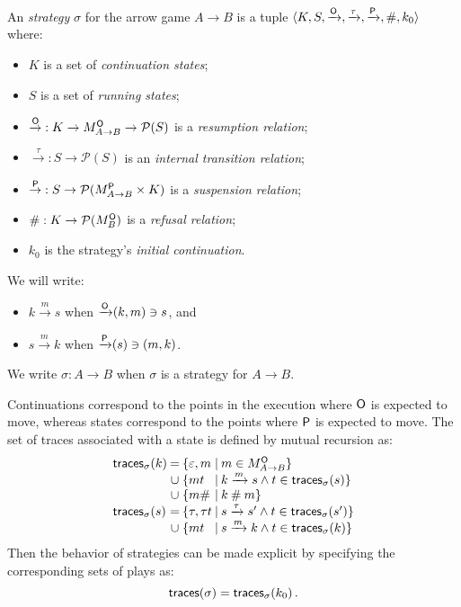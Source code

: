 \begin{definition} %
An \emph{strategy} $\sigma$ for the arrow game $A \rightarrow B$
is a tuple
$\langle K, S,
{\xrightarrow{ \mathsf{O} } },
{\xrightarrow{\tau}},
{\xrightarrow{ \mathsf{P} } },
 \#, k_0 \rangle$
where:
\begin{itemize}
  \item $K$ is a set of \emph{continuation states};
  \item $S$ is a set of \emph{running states};
  \item ${\stackrel{ \mathsf{O} }{\rightarrow}} :
         K \rightarrow M_{A \rightarrow B}^{ \mathsf{O} } \rightarrow \mathcal{P}(S)$
    is a \emph{resumption relation};
  \item ${\stackrel{\tau}{\rightarrow}} : S \rightarrow \mathcal{P}(S)$
    is an \emph{internal transition relation};
  \item ${\stackrel{ \mathsf{P} }{\rightarrow}} :
         S \rightarrow \mathcal{P}(M_{A \rightarrow B}^{ \mathsf{P} } \times K)$
    is a \emph{suspension relation};
  \item ${\#} : K \rightarrow \mathcal{P}(M_B^{ \mathsf{O} })$
    is a \emph{refusal relation};
  \item $k_0$
    is the strategy's \emph{initial continuation}.
\end{itemize}
We will write:
\begin{itemize}
  \item $k \xrightarrow{m} s$ when ${\xrightarrow{ \mathsf{O} } }(k, m) \ni s$, and
  \item $s \xrightarrow{m} k$ when ${\xrightarrow{ \mathsf{P} } }(s) \ni (m, k)$.
\end{itemize}
We write $\sigma : A \rightarrow B$ when $\sigma$ is a strategy
for $A \rightarrow B$.
\end{definition}

Continuations correspond to
the points in the execution where $ \mathsf{O} $ is expected to move,
whereas states correspond to
the points where $ \mathsf{P} $ is expected to move.
The set of traces associated with a state is
defined by mutual recursion as:
\[
  \begin{array}{l@{\:}c@{\:\{}l@{\:\mid\:}l}
    \kw{traces}_\sigma(k) & = & \varepsilon, m &
      m \in M_{A \rightarrow B}^\kw{O} \} \\
    & \cup & m t &
      k \xrightarrow{m} s \wedge t \in \kw{traces}_\sigma(s) \} \\
    & \cup & m \# &
      k \: \# \: m \} \\
    \kw{traces}_\sigma(s) & = & \tau, \tau t &
      s \xrightarrow{\tau} s' \wedge t \in \kw{traces}_\sigma(s') \} \\
    & \cup & m t &
      s \xrightarrow{m} k \wedge t \in \kw{traces}_\sigma(k) \}
  \end{array}
\]
Then the behavior of strategies can be made explicit
by specifying the corresponding sets of plays as:
\[
   \mathsf{traces} (\sigma) =  \mathsf{traces} _\sigma(k_0) \,.
\]

